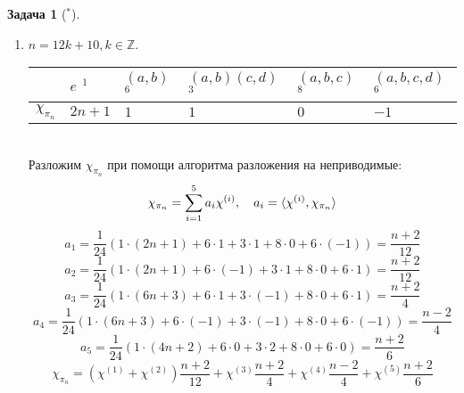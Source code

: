 \documentclass[12pt]{article}
\theoremstyle{definition}
\newtheorem{zad}{Задача}[section]
\begin{document}
\begin{zad}[$^*$]
\begin{itemize}
\begin{enumerate}
    \item $n=12k+10,k\in\mathbb{Z}$.
    \begin{table}[h!]
    \centering
    \begin{tabular}{|l|l|l|l|l|l|}
    \hline
     & $e$ $^1$ & $(a,b)$ $^6$ & $(a,b)(c,d)$ $^3$ & $(a,b,c)$ $^8$ & $(a,b,c,d)$ $^6$ \\ \hline
    $\chi_{\pi_n}$ & $2n+1$ & $1$ & $1$ & $0$ & $-1$ \\ \hline
    \end{tabular}
    \end{table}\\
    Разложим $\chi_{\pi_n}$ при помощи алгоритма разложения на неприводимые:
    \begin{equation}
        \chi_{\pi_n}=\sum\limits_{i=1}^5 a_i\chi^{(i)},\quad a_i=\braket{\chi^{(i)},\chi_{\pi_n}}
    \end{equation}
    \begin{equation}
        a_1=\frac{1}{24}(1\cdot(2n+1)+6\cdot1+3\cdot1+8\cdot0+6\cdot(-1))=\frac{n+2}{12}
    \end{equation}
    \begin{equation}
        a_2=\frac{1}{24}(1\cdot(2n+1)+6\cdot(-1)+3\cdot1+8\cdot0+6\cdot1)=\frac{n+2}{12}
    \end{equation}
    \begin{equation}
        a_3=\frac{1}{24}(1\cdot(6n+3)+6\cdot1+3\cdot(-1)+8\cdot0+6\cdot1)=\frac{n+2}{4}
    \end{equation}
    \begin{equation}
        a_4=\frac{1}{24}(1\cdot(6n+3)+6\cdot(-1)+3\cdot(-1)+8\cdot0+6\cdot(-1))=\frac{n-2}{4}
    \end{equation}
    \begin{equation}
        a_5=\frac{1}{24}(1\cdot(4n+2)+6\cdot0+3\cdot2+8\cdot0+6\cdot0)=\frac{n+2}{6}
    \end{equation}
    \begin{equation}
        \boxed{\chi_{\pi_n}=(\chi^{(1)}+\chi^{(2)})\frac{n+2}{12}+\chi^{(3)}\frac{n+2}{4}+\chi^{(4)}\frac{n-2}{4}+\chi^{(5)}\frac{n+2}{6}}
    \end{equation}
    

\end{enumerate}
\end{itemize}
\end{zad}
\end{document}
